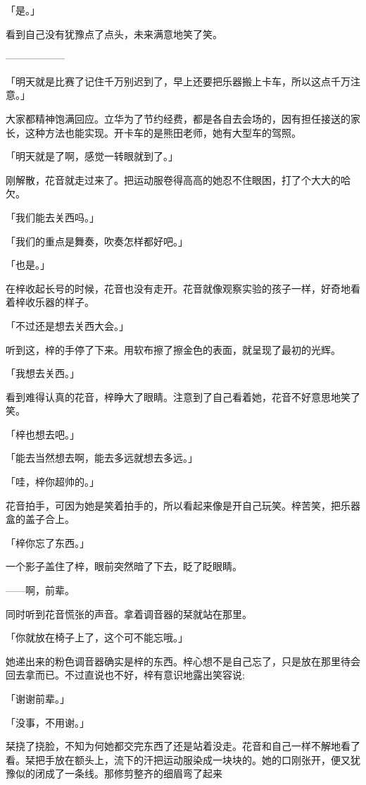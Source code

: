 \documentclass[UTF8]{ctexart}
\begin{document}
    「是。」

    看到自己没有犹豫点了点头，未来满意地笑了笑。

    ——————

    「明天就是比赛了记住千万别迟到了，早上还要把乐器搬上卡车，所以这点千万注意。」

    大家都精神饱满回应。立华为了节约经费，都是各自去会场的，因有担任接送的家长，这种方法也能实现。开卡车的是熊田老师，她有大型车的驾照。

    「明天就是了啊，感觉一转眼就到了。」

    刚解散，花音就走过来了。把运动服卷得高高的她忍不住眼困，打了个大大的哈欠。

    「我们能去关西吗。」

    「我们的重点是舞奏，吹奏怎样都好吧。」

    「也是。」

    在梓收起长号的时候，花音也没有走开。花音就像观察实验的孩子一样，好奇地看着梓收乐器的样子。

    「不过还是想去关西大会。」

    听到这，梓的手停了下来。用软布擦了擦金色的表面，就呈现了最初的光辉。

    「我想去关西。」

    看到难得认真的花音，梓睁大了眼睛。注意到了自己看着她，花音不好意思地笑了笑。

    「梓也想去吧。」

    「能去当然想去啊，能去多远就想去多远。」

    「哇，梓你超帅的。」

    花音拍手，可因为她是笑着拍手的，所以看起来像是开自己玩笑。梓苦笑，把乐器盒的盖子合上。

    「梓你忘了东西。」

    一个影子盖住了梓，眼前突然暗了下去，眨了眨眼睛。

    ——啊，前辈。

    同时听到花音慌张的声音。拿着调音器的栞就站在那里。

    「你就放在椅子上了，这个可不能忘哦。」

    她递出来的粉色调音器确实是梓的东西。梓心想不是自己忘了，只是放在那里待会回去拿而已。不过直说也不好，梓有意识地露出笑容说;

    「谢谢前辈。」

    「没事，不用谢。」

    栞挠了挠脸，不知为何她都交完东西了还是站着没走。花音和自己一样不解地看了看。栞把手放在额头上，流下的汗把运动服染成一块块的。她的口刚张开，便又犹豫似的闭成了一条线。那修剪整齐的细眉弯了起来
\end{document}
